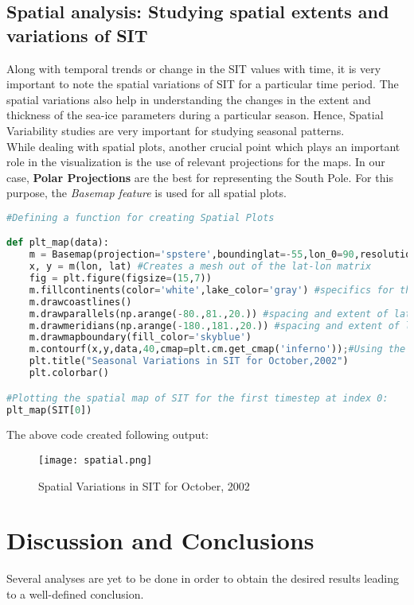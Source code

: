 \documentclass{article} %
\begin{document}
\subsection{Spatial analysis: Studying spatial extents and variations of SIT}

Along with temporal trends or change in the SIT values with time, it is very important to note the spatial variations of SIT for a particular time period. The spatial variations also help in understanding the changes in the extent and thickness of the sea-ice parameters during a particular season. Hence, Spatial Variability studies are very important for studying seasonal patterns. \\
While dealing with spatial plots, another crucial point which plays an important role in the visualization is the use of relevant projections for the maps. In our case, {\bf Polar Projections} are the best for representing the South Pole. For this purpose, the {\it Basemap feature} is used for all spatial plots. \\


\begin{lstlisting}[language=Python, caption= Creating Spatial Plots]
#Defining a function for creating Spatial Plots 

def plt_map(data):
    m = Basemap(projection='spstere',boundinglat=-55,lon_0=90,resolution='l') #Creates a basemap with south pole oriented projection with the domain extending from 55S to 90S.
    x, y = m(lon, lat) #Creates a mesh out of the lat-lon matrix
    fig = plt.figure(figsize=(15,7))
    m.fillcontinents(color='white',lake_color='gray') #specifics for the basemap aesthetic
    m.drawcoastlines()
    m.drawparallels(np.arange(-80.,81.,20.)) #spacing and extent of latitudes
    m.drawmeridians(np.arange(-180.,181.,20.)) #spacing and extent of longitudes
    m.drawmapboundary(fill_color='skyblue')
    m.contourf(x,y,data,40,cmap=plt.cm.get_cmap('inferno'));#Using the fill countor method of plotting 
    plt.title("Seasonal Variations in SIT for October,2002")
    plt.colorbar()

#Plotting the spatial map of SIT for the first timestep at index 0:
plt_map(SIT[0])

\end{lstlisting}

The above code created following output: 

\begin{figure}[h]
    \centering
    \texttt{[image: spatial.png]}%
    \caption{Spatial Variations in SIT for October, 2002}
    \label{fig:spatial} %
\end{figure}

\section{Discussion and Conclusions}

Several analyses are yet to be done in order to obtain the desired results leading to a well-defined conclusion.



\end{document}
